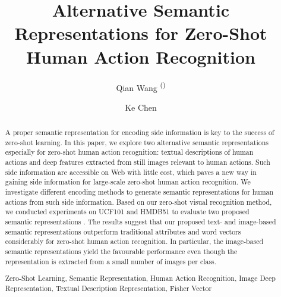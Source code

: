 \documentclass[runningheads,a4paper] {llncs}
\newcommand{\keywords}[1]{\par\addvspace\baselineskip
\noindent\keywordname\enspace\ignorespaces#1}
\begin{document}
\mainmatter  

\title{Alternative Semantic Representations for Zero-Shot Human Action Recognition}


\author{Qian Wang \textsuperscript{(\Letter)} \and Ke Chen}





\maketitle


\begin{abstract}
    A proper semantic representation for encoding side information is key to the success of zero-shot learning. In this paper, we explore two alternative semantic representations especially for zero-shot human action recognition:  textual descriptions of human actions and deep features extracted from still images relevant to human actions. Such side information are accessible on Web with little cost, which paves a new way in gaining side information for large-scale zero-shot human action recognition. We investigate different encoding methods to generate semantic representations for human actions from such side information. Based on our zero-shot visual recognition method, we conducted experiments on UCF101 and HMDB51 to evaluate two proposed semantic representations . The results suggest that our proposed text- and image-based semantic representations outperform traditional attributes and word vectors considerably for zero-shot human action recognition. In particular, the image-based semantic representations yield the favourable performance even though the representation is extracted from a small number of images per class.

\keywords{Zero-Shot Learning, Semantic Representation, Human Action Recognition, Image Deep Representation, Textual Description Representation, Fisher Vector}
\end{abstract}
\end{document}

